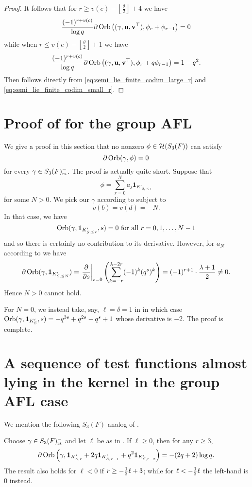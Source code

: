 \begin{proof}
  It follows that for $r \ge v(e) - \left\lfloor \frac{\theta}{2} \right\rfloor + 4$ we have
  \begin{equation}
    \frac{(-1)^{r+v(c)}}{\log q}
    \partial \operatorname{Orb} \left( {(\gamma, \mathbf u, \mathbf v^\top)}, \phi_r + \phi_{r-1} \right) = 0
    \label{eq:semi_lie_finite_codim_large_r}
  \end{equation}
  while when $r \le v(e) - \left\lfloor \frac{\theta}{2} \right\rfloor + 1$ we have
  \begin{equation}
    \frac{(-1)^{r+v(c)}}{\log q}
    \partial \operatorname{Orb} \left( {(\gamma, \mathbf u, \mathbf v^\top)}, \phi_r + q\phi_{r-1} \right)
    = 1-q^2.
    \label{eq:semi_lie_finite_codim_small_r}
  \end{equation}
  Then  follows directly
  from \eqref{eq:semi_lie_finite_codim_large_r} and \eqref{eq:semi_lie_finite_codim_small_r}.
\end{proof}
\section{Proof of  for the group AFL}
We give a proof in this section that no nonzero $\phi \in \mathcal H(S_3(F))$ can satisfy
\[ \partial \operatorname{Orb}(\gamma, \phi) = 0 \]
for every $\gamma \in S_3(F)_{\mathrm{rs}}^-$.
The proof is actually quite short.
Suppose that
\[ \phi = \sum_{r=0}^N a_j \mathbf{1}_{K'_{S, \le r}} \]
for some $N > 0$.
We pick our $\gamma$ according to  subject to
\[ v(b) = v(d) = -N. \]
In that case, we have
\[ \operatorname{Orb}(\gamma, \mathbf{1}_{K'_{S, \le r}}, s) = 0 \text{ for all } r = 0, 1, \dots, N-1 \]
and so there is certainly no contribution to its derivative.
However, for $a_N$ according to  we have
\[
  \partial \operatorname{Orb}(\gamma, \mathbf{1}_{K'_{S, \le N}})
  = \left. \pdv{}{s} \right\rvert_{s=0}
  \left( \sum_{k=-r}^{\lambda-2r} (-1)^k (q^s)^k \right)
  = (-1)^{r+1} \cdot \frac{\lambda+1}{2} \neq 0.
\]
Hence $N > 0$ cannot hold.

For $N=0$, we instead take, say, $\ell = \delta = 1$ in 
in which case $\operatorname{Orb}(\gamma, \mathbf{1}_{K'_S}, s) = -q^{3s} + q^{2s} - q^s + 1$
whose derivative is $-2$.
The proof is complete.

\section{A sequence of test functions almost lying in the kernel in the group AFL case}
We mention the following $S_3(F)$ analog of .
\begin{theorem}
  [A sequence in $\HH(S_3(F))$]
  \label{thm:group_kernel_full}
  Choose $\gamma \in S_3(F)_{\mathrm{rs}}^-$ and let $\ell$ be as in .
  If $\ell \ge 0$, then for any $r \ge 3$,
  \[ \partial \operatorname{Orb}\left(\gamma, \mathbf{1}_{K'_{S, r}} + 2q \mathbf{1}_{K'_{S, r-1}}
    + q^2 \mathbf{1}_{K'_{S, r-2}}\right) = -(2q+2) \log q. \]
  The result also holds for $\ell < 0$ if $r \ge -\frac{1}{2}\ell + 3$;
  while for $\ell < -\frac{1}{2}\ell$ the left-hand is $0$ instead.
\end{theorem}

